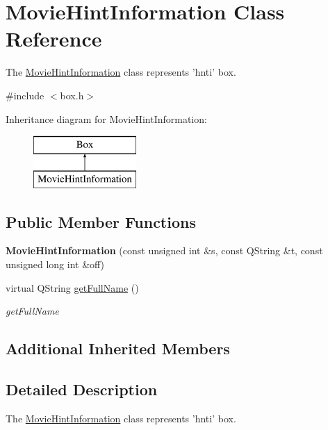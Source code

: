 \hypertarget{class_movie_hint_information}{\section{Movie\-Hint\-Information Class Reference}
\label{class_movie_hint_information}
}


The \hyperlink{class_movie_hint_information}{Movie\-Hint\-Information} class represents 'hnti' box.  




{\ttfamily \#include $<$box.\-h$>$}

Inheritance diagram for Movie\-Hint\-Information\-:\begin{figure}[H]
\begin{center}
\leavevmode
\includegraphics[height=2.000000cm]{class_movie_hint_information}
\end{center}
\end{figure}
\subsection*{Public Member Functions}
\begin{DoxyCompactItemize}
\item 
\hypertarget{class_movie_hint_information_a1f99b67674a151c9f3b4742a151c2743}{{\bfseries Movie\-Hint\-Information} (const unsigned int \&s, const Q\-String \&t, const unsigned long int \&off)}\label{class_movie_hint_information_a1f99b67674a151c9f3b4742a151c2743}

\item 
virtual Q\-String \hyperlink{class_movie_hint_information_ab85d823e7fd70195e0f066cd305dce1c}{get\-Full\-Name} ()
\begin{DoxyCompactList}\small\item\em get\-Full\-Name \end{DoxyCompactList}\end{DoxyCompactItemize}
\subsection*{Additional Inherited Members}


\subsection{Detailed Description}
The \hyperlink{class_movie_hint_information}{Movie\-Hint\-Information} class represents 'hnti' box. 

